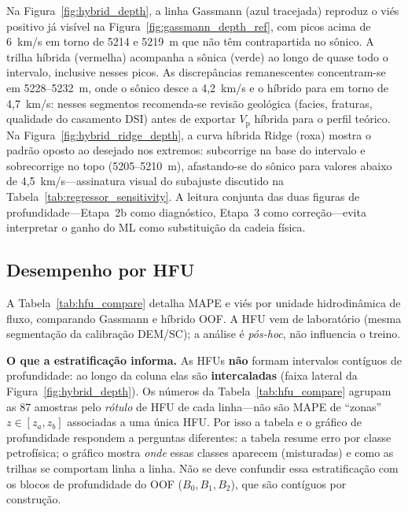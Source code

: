 \documentclass[11pt,a4paper]{article}
\numberwithin{equation}{section}
\newcommand{\Vp}{\ensuremath{V_{\mathrm{p}}}}
\begin{document}
Na Figura~\ref{fig:hybrid_depth}, a linha Gassmann (azul tracejada) reproduz o
viés positivo já visível na Figura~\ref{fig:gassmann_depth_ref}, com picos
acima de 6~km/s em torno de 5214 e 5219~m que não têm contrapartida no sônico.
A trilha híbrida (vermelha) acompanha a sônica (verde) ao longo de quase todo o
intervalo, inclusive nesses picos.
As discrepâncias remanescentes concentram-se em 5228--5232~m, onde o sônico
desce a 4,2~km/s e o híbrido para em torno de 4,7~km/s: nesses segmentos
recomenda-se revisão geológica (facies, fraturas, qualidade do
casamento DSI) antes de exportar \Vp{} híbrida para o perfil teórico.
Na Figura~\ref{fig:hybrid_ridge_depth}, a curva híbrida Ridge (roxa) mostra o
padrão oposto ao desejado nos extremos: subcorrige na base do intervalo e
sobrecorrige no topo (5205--5210~m), afastando-se do sônico para valores
abaixo de 4,5~km/s---assinatura visual do subajuste discutido na
Tabela~\ref{tab:regressor_sensitivity}.
A leitura conjunta das duas figuras de profundidade---Etapa~2b como diagnóstico,
Etapa~3 como correção---evita interpretar o ganho do ML como substituição
da cadeia física.

\subsection{Desempenho por HFU}
\label{sec:resultados_hfu}

A Tabela~\ref{tab:hfu_compare} detalha MAPE e viés por unidade hidrodinâmica
de fluxo, comparando Gassmann e híbrido OOF.
A HFU vem de laboratório (mesma segmentação da calibração DEM/SC);
a análise é \emph{pós-hoc}, não influencia o treino.

\textbf{O que a estratificação informa.}
As HFUs \textbf{não} formam intervalos contíguos de profundidade: ao longo
da coluna elas são \textbf{intercaladas} (faixa lateral da
Figura~\ref{fig:hybrid_depth}).
Os números da Tabela~\ref{tab:hfu_compare} agrupam as 87 amostras pelo
\emph{rótulo} de HFU de cada linha---não são MAPE de ``zonas''
$z\in[z_a,z_b]$ associadas a uma única HFU.
Por isso a tabela e o gráfico de profundidade respondem a perguntas
diferentes: a tabela resume erro por classe petrofísica; o gráfico mostra
\emph{onde} essas classes aparecem (misturadas) e como as trilhas se
comportam linha a linha.
Não se deve confundir essa estratificação com os blocos de profundidade
do OOF ($B_0,B_1,B_2$), que são contíguos por construção.
\end{document}

